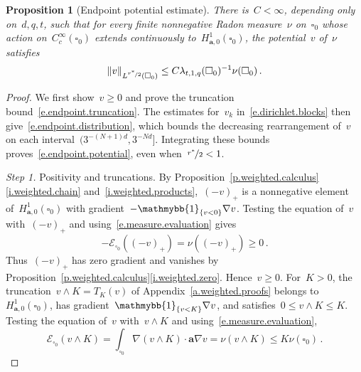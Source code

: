 \documentclass[11pt,letterpaper]{article}
\numberwithin{equation}{section}
\newtheorem{proposition}[theorem]{Proposition}
\theoremstyle{definition}
\renewcommand{\a}{\mathbf{a}}
\newcommand{\nf}{\nicefrac}
\newcommand{\cu}{\square}
\DeclarePairedDelimiter{\norm}{\lVert}{\rVert}
\newcommand{\indc}{{\mathmybb{1}}}
\newcommand{\Ener}{\mathcal E}
\newcommand{\Hzero}[1]{H^1_{#1,0}}
\begin{document}
\begin{proposition}[Endpoint potential estimate]
\label{p.endpoint.potential}
There is~$C<\infty$, depending only on~$d,q,t$, such that for every finite nonnegative Radon measure~$\nu$ on~$\cu_0$ whose action on~$C^\infty_c(\cu_0)$ extends continuously to~$\Hzero{\a}(\cu_0)$, the potential~$v$ of~$\nu$ satisfies
\begin{equation}
	\norm{v}_{L^{\nf{r^*}2}(\cu_0)}\leq C\lambda_{t,1,q}(\cu_0)^{-1}\nu(\cu_0)\,.
	\label{e.endpoint.potential}
\end{equation}
\end{proposition}

\begin{proof}
We first show~$v\geq0$ and prove the truncation bound~\eqref{e.endpoint.truncation}. The estimates for~$v_k$ in~\eqref{e.dirichlet.blocks} then give~\eqref{e.endpoint.distribution}, which bounds the decreasing rearrangement of~$v$ on each interval~$(3^{-(N+1)d},3^{-Nd}]$. Integrating these bounds proves~\eqref{e.endpoint.potential}, even when~$\nf{r^*}2<1$.

\smallskip

\emph{Step 1.} Positivity and truncations. By Proposition~\ref{p.weighted.calculus}\ref{i.weighted.chain} and~\ref{i.weighted.products},~$(-v)_+$ is a nonnegative element of~$\Hzero{\a}(\cu_0)$ with gradient~$-\indc_{\{v<0\}}\nabla v$. Testing the equation of~$v$ with~$(-v)_+$ and using~\eqref{e.measure.evaluation} gives
\begin{equation*}
	-\Ener_{\cu_0}((-v)_+)=\nu((-v)_+)\geq0\,.
\end{equation*}
Thus~$(-v)_+$ has zero gradient and vanishes by Proposition~\ref{p.weighted.calculus}\ref{i.weighted.zero}. Hence~$v\geq0$. For~$K>0$, the truncation~$v\wedge K=T_K(v)$ of Appendix~\ref{a.weighted.proofs} belongs to~$\Hzero{\a}(\cu_0)$, has gradient~$\indc_{\{v<K\}}\nabla v$, and satisfies~$0\leq v\wedge K\leq K$. Testing the equation of~$v$ with~$v\wedge K$ and using~\eqref{e.measure.evaluation},
\begin{equation}
	\Ener_{\cu_0}(v\wedge K)=\int_{\cu_0}\nabla(v\wedge K)\cdot\a\nabla v=\nu(v\wedge K)\leq K\nu(\cu_0)\,.
	\label{e.endpoint.truncation}
\end{equation}

\smallskip


\end{proof}
\end{document}
